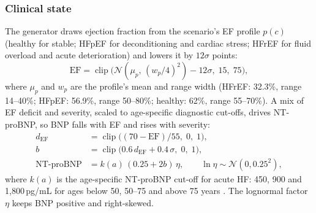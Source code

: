\documentclass[conference]{IEEEtran}
\begin{document}
\subsubsection{Clinical state}
The generator draws ejection fraction from the scenario's EF profile $p(c)$ (healthy for stable; HFpEF for deconditioning and cardiac stress; HFrEF for fluid overload and acute deterioration) and lowers it by $12\sigma$ points:
\begin{equation}
\text{EF}=\operatorname{clip}\!\big(\mathcal{N}(\mu_p,\,(w_p/4)^2)-12\sigma,\;15,\;75\big),
\label{eq:ef}
\end{equation}
where $\mu_p$ and $w_p$ are the profile's mean and range width (HFrEF: 32.3\%, range 14--40\%; HFpEF: 56.9\%, range 50--80\%; healthy: 62\%, range 55--70\%). A mix of EF deficit and severity, scaled to age-specific diagnostic cut-offs, drives NT-proBNP, so BNP falls with EF and rises with severity:
\begin{align}
d_{\text{EF}}&=\operatorname{clip}\!\big((70-\text{EF})/55,\;0,\;1\big),\label{eq:efdeficit}\\
b&=\operatorname{clip}\!\big(0.6\,d_{\text{EF}}+0.4\,\sigma,\;0,\;1\big),\\
\text{NT-proBNP}&=k(a)\,(0.25+2b)\,\eta,\qquad \ln\eta\sim\mathcal{N}(0,0.25^2),
\end{align}
where $k(a)$ is the age-specific NT-proBNP cut-off for acute HF: 450, 900 and 1,800\,pg/mL for ages below 50, 50--75 and above 75 years \cite{januzzi2006icon}. The lognormal factor $\eta$ keeps BNP positive and right-skewed.
\end{document}
